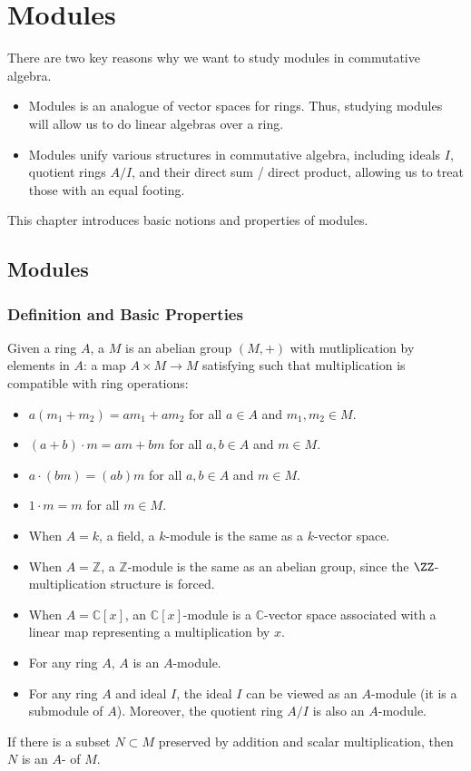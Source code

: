 \chapter{Modules}
\label{chap:modules}
There are two key reasons why we want to study modules
in commutative algebra.
\begin{itemize}
    \item Modules is an analogue of vector spaces for rings.
    Thus, studying modules will allow us to do linear algebras
    over a ring.
    \item Modules unify various structures in commutative algebra,
    including ideals $I$, quotient rings $A/I$,
    and their direct sum / direct product,
    allowing us to treat those with an equal footing.
\end{itemize}
This chapter introduces basic notions and properties of modules.
\section{Modules}
\subsection{Definition and Basic Properties}
\begin{definition}[Modules]
Given a ring $A$, a  $M$ is an abelian group $(M,+)$
with mutliplication by elements in $A$:
a map $A\times M\to M$ satisfying
such that multiplication is compatible with ring operations:
\begin{itemize}
    \item $a(m_1+m_2) = am_1+am_2$ for all $a\in A$ and 
    $m_1,m_2\in M$.
    \item $(a+b)\cdot m = am + bm$ for all $a,b\in A$ and $m\in M$.
    \item $a\cdot (bm) = (ab)m$ for all $a,b\in A$
    and $m\in M$.
    \item $1\cdot m = m$ for all $m\in M$.
\end{itemize}
\end{definition}
\begin{example}
\begin{itemize}
    \item When $A=k$, a field, a $k$-module is the same as 
    a $k$-vector space.
    \item When $A=\mathbb Z$, a $\mathbb Z$-module is the same 
    as an abelian group, since the $\ZZ$-multiplication 
    structure is forced.
    \item When $A=\mathbb C[x]$, an $\mathbb C[x]$-module
	is a $\mathbb C$-vector space associated with
	a linear map representing a multiplication by $x$.
    \item For any ring $A$, $A$ is an $A$-module.
    \item For any ring $A$ and ideal $I$, the ideal $I$ 
    can be viewed as an $A$-module (it is a submodule of $A$).
    Moreover, the quotient ring $A/I$ is also an $A$-module.
\end{itemize}
\end{example}
If there is a subset $N\subset M$ preserved by
addition and scalar multiplication, then
$N$ is an $A$- of $M$.

